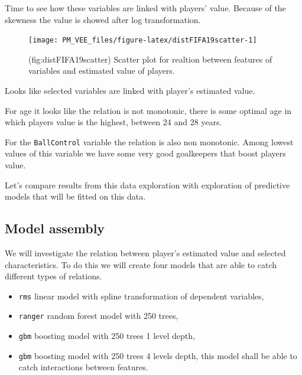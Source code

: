 \documentclass[12pt,]{krantz}
\providecommand{\tightlist}{%
  \setlength{\itemsep}{0pt}\setlength{\parskip}{0pt}}
\begin{document}
Time to see how these variables are linked with players' value.
Because of the skewness the value is showed after log transformation.

\begin{figure}

{\centering \texttt{[image: PM\_VEE\_files/figure-latex/distFIFA19scatter-1]} 

}

\caption{(fig:distFIFA19scatter) Scatter plot for realtion between features of variables and estimated value of players.}\label{fig:distFIFA19scatter}
\end{figure}

Looks like selected variables are linked with player's estimated value.

For age it looks like the relation is not monotonic, there is some optimal age in which players value is the highest, between 24 and 28 years.

For the \texttt{BallControl} variable the relation is also non monotonic. Among lowest values of this variable we have some very good goalkeepers that boost players value.

Let's compare results from this data exploration with exploration of predictive models that will be fitted on this data.

\hypertarget{model-assembly-1}{%
\subsection{Model assembly}\label{model-assembly-1}}

We will investigate the relation between player's estimated value and selected characteristics. To do this we will create four models that are able to catch different types of relations.

\begin{itemize}
\tightlist
\item
  \texttt{rms} linear model with spline transformation of dependent variables,
\item
  \texttt{ranger} random forest model with 250 trees,
\item
  \texttt{gbm} boosting model with 250 trees 1 level depth,
\item
  \texttt{gbm} boosting model with 250 trees 4 levels depth, this model shall be able to catch interactions between features.
\end{itemize}
\end{document}
